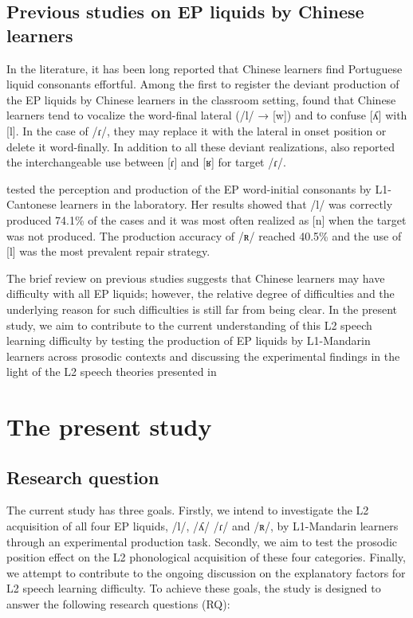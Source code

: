 \documentclass[output=paper]{../langscibook}
\begin{document}
\subsection{Previous studies on EP liquids by Chinese learners}



In the literature, it has been long reported that Chinese learners find Portuguese liquid consonants effortful. Among the first to register the deviant production of the EP liquids by Chinese learners in the classroom setting, \citet{Batalha1995} found that Chinese learners tend to vocalize the word-final lateral (/l/ → [w]) and to confuse [ʎ] with [l]. In the case of /ɾ/, they may replace it with the lateral in onset position or delete it word-finally. In addition to all these deviant realizations, \citet{Martins2008} also reported the interchangeable use between [ɾ] and [ʁ] for target /ɾ/.

\citet{Oliveira2016} tested the perception and production of the EP word-initial consonants by L1-Cantonese learners in the laboratory. Her results showed that /l/ was correctly produced 74.1\% of the cases and it was most often realized as [n] when the target was not produced. The production accuracy of /ʀ/ reached 40.5\% and the use of [l] was the most prevalent repair strategy.

The brief review on previous studies suggests that Chinese learners may have difficulty with all EP liquids; however, the relative degree of difficulties and the underlying reason for such difficulties is still far from being clear. In the present study, we aim to contribute to the current understanding of this L2 speech learning difficulty by testing the production of EP liquids by L1-Mandarin learners across prosodic contexts and discussing the experimental findings in the light of the L2 speech theories presented in 


\section{The present study}
\label{sec:zhou:4}
\subsection{Research question}



The current study has three goals. Firstly, we intend to investigate the L2 acquisition of all four EP liquids, /l/, /ʎ/ /ɾ/ and /ʀ/, by L1-Mandarin learners through an experimental production task. Secondly, we aim to test the prosodic position effect on the L2 phonological acquisition of these four categories. Finally, we attempt to contribute to the ongoing discussion on the explanatory factors for L2 speech learning difficulty. To achieve these goals, the study is designed to answer the following research questions (RQ):
\end{document}
